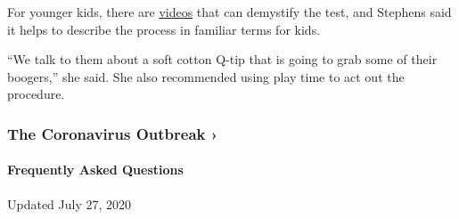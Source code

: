 For younger kids, there are
\href{https://www.mayoclinic.org/patient-education?VID=VID-20483010}{videos}
that can demystify the test, and Stephens said it helps to describe the
process in familiar terms for kids.

``We talk to them about a soft cotton Q-tip that is going to grab some
of their boogers,'' she said. She also recommended using play time to
act out the procedure.

\href{https://www.nytimes.com/news-event/coronavirus?action=click\&pgtype=Article\&state=default\&region=MAIN_CONTENT_3\&context=storylines_faq}{}

\hypertarget{the-coronavirus-outbreak-}{%
\subsubsection{The Coronavirus Outbreak
›}\label{the-coronavirus-outbreak-}}

\hypertarget{frequently-asked-questions}{%
\paragraph{Frequently Asked
Questions}\label{frequently-asked-questions}}

Updated July 27, 2020

